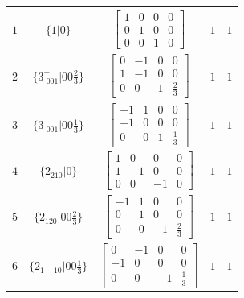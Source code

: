 \documentclass[fleqn,8pt]{jsarticle}
\begin{document}
\begin{longtable}{ccccc}
$ 1 $ & $ \{1|0\} $ & $ \begin{bmatrix} 1 & 0 & 0 & 0 \\ 0 & 1 & 0 & 0 \\ 0 & 0 & 1 & 0 \end{bmatrix} $ & $ 1 $ & $ 1 $ \\ \hline
$ 2 $ & $ \{3^{+}_{\,\,001}|0 0 \frac{2}{3}\} $ & $ \begin{bmatrix} 0 & -1 & 0 & 0 \\ 1 & -1 & 0 & 0 \\ 0 & 0 & 1 & \frac{2}{3} \end{bmatrix} $ & $ 1 $ & $ 1 $ \\ \hline
$ 3 $ & $ \{3^{-}_{\,\,001}|0 0 \frac{1}{3}\} $ & $ \begin{bmatrix} -1 & 1 & 0 & 0 \\ -1 & 0 & 0 & 0 \\ 0 & 0 & 1 & \frac{1}{3} \end{bmatrix} $ & $ 1 $ & $ 1 $ \\ \hline
$ 4 $ & $ \{2{}_{210}|0\} $ & $ \begin{bmatrix} 1 & 0 & 0 & 0 \\ 1 & -1 & 0 & 0 \\ 0 & 0 & -1 & 0 \end{bmatrix} $ & $ 1 $ & $ 1 $ \\ \hline
$ 5 $ & $ \{2{}_{120}|0 0 \frac{2}{3}\} $ & $ \begin{bmatrix} -1 & 1 & 0 & 0 \\ 0 & 1 & 0 & 0 \\ 0 & 0 & -1 & \frac{2}{3} \end{bmatrix} $ & $ 1 $ & $ 1 $ \\ \hline
$ 6 $ & $ \{2{}_{1-10}|0 0 \frac{1}{3}\} $ & $ \begin{bmatrix} 0 & -1 & 0 & 0 \\ -1 & 0 & 0 & 0 \\ 0 & 0 & -1 & \frac{1}{3} \end{bmatrix} $ & $ 1 $ & $ 1 $ \\
\end{longtable}
\end{document}

